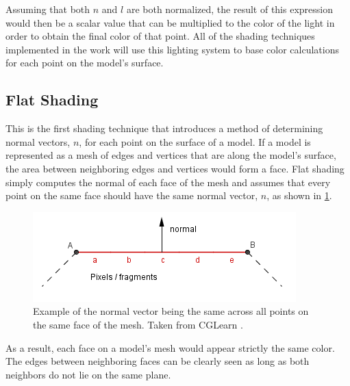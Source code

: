\documentclass[10pt,twocolumn,letterpaper]{article}
\begin{document}
Assuming that both $n$ and $l$ are both normalized, the result of this expression would then be a scalar value that can be multiplied to the color of the light in order to obtain the final color of that point. All of the shading techniques implemented in the work will use this lighting system to base color calculations for each point on the model's surface.

\subsection{Flat Shading}

This is the first shading technique that introduces a method of determining normal vectors, $n$, for each point on the surface of a model. If a model is represented as a mesh of edges and vertices that are along the model's surface, the area between neighboring edges and vertices would form a face. Flat shading \cite{cglearn} simply computes the normal of each face of the mesh and assumes that every point on the same face should have the same normal vector, $n$, as shown in \cref{fig:flat}. 

\begin{figure}[t]
  \centering
  \includegraphics[width=1\linewidth]{flatShading.png}

   \caption{Example of the normal vector being the same across all points on the same face of the mesh. Taken from CGLearn \cite{cglearn}.}
   \label{fig:flat}
\end{figure}

As a result, each face on a model's mesh would appear strictly the same color. The edges between neighboring faces can be clearly seen as long as both neighbors do not lie on the same plane.
\end{document}
